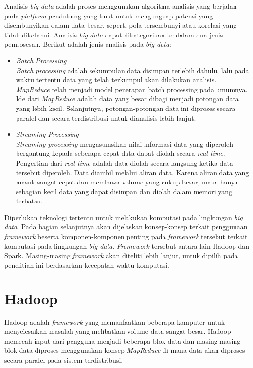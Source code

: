 \noindent Analisis \textit{big data} adalah proses menggunakan algoritma analisis yang berjalan pada \textit{platform} pendukung yang kuat untuk mengungkap potensi yang disembunyikan dalam data besar, seperti pola tersembunyi atau korelasi yang tidak diketahui. Analisis \textit{big data} dapat dikategorikan ke dalam dua jenis pemrosesan. Berikut adalah jenis analisis pada \textit{big data}:

\begin{itemize}
\item 
\textit{Batch Processing}\\
\textit{Batch processing} adalah sekumpulan data disimpan terlebih dahulu, lalu pada waktu tertentu data yang telah terkumpul akan dilakukan analisis. \textit{MapReduce} telah menjadi model penerapan batch processing pada umumnya. Ide dari \textit{MapReduce} adalah data yang besar dibagi menjadi potongan data yang lebih kecil. Selanjutnya, potongan-potongan data ini diproses secara paralel dan secara terdistribusi untuk dianalisis lebih lanjut. 

\item
\textit{Streaming Processing}\\
\textit{Streaming processing} mengasumsikan nilai informasi data yang diperoleh bergantung kepada seberapa cepat data dapat diolah secara \textit{real time}. Pengertian dari \textit{real time} adalah data diolah secara langsung ketika data tersebut diperoleh. Data diambil melalui aliran data. Karena aliran data yang masuk sangat cepat dan membawa volume yang cukup besar, maka hanya sebagian kecil data yang dapat disimpan dan diolah dalam memori yang terbatas. 
\end{itemize}

\noindent Diperlukan teknologi tertentu untuk melakukan komputasi pada lingkungan  \textit{big data}. Pada bagian selanjutnya akan dijelaskan konsep-konsep terkait penggunaan \textit{framework} beserta komponen-komponen penting pada \textit{framework} tersebut terkait komputasi pada lingkungan \textit{big data}. \textit{Framework} tersebut antara lain Hadoop dan Spark. Masing-masing \textit{framework} akan diteliti lebih lanjut, untuk dipilih pada penelitian ini berdasarkan kecepatan waktu komputasi.

\section{Hadoop}
Hadoop adalah \textit{framework} yang memanfaatkan beberapa komputer untuk menyelesaikan masalah yang melibatkan volume data sangat besar. Hadoop memecah input dari pengguna menjadi beberapa blok data dan masing-masing blok data diproses menggunakan konsep \textit{MapReduce} di mana data akan diproses secara paralel pada sistem terdistribusi. 

